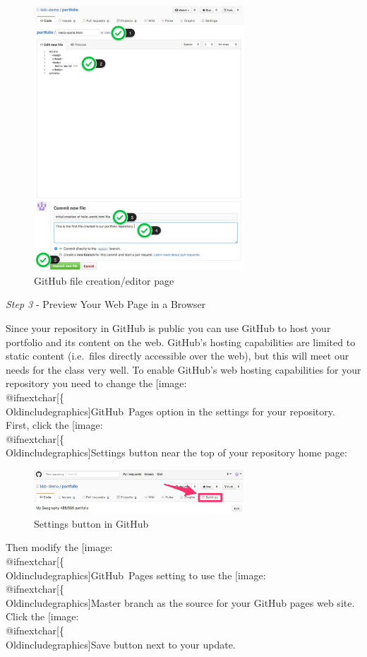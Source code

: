 \documentclass[]{book}
\makeatletter
\def\ScaleIfNeeded{%
  \ifdim\Gin@nat@width>.5\linewidth
    .5\linewidth
  \else
    \Gin@nat@width
  \fi
}
\let\Oldincludegraphics\texttt{[image: \%
 \\catcode`\\@=11\\relax\%
 \%\\gdef\\includegraphics\{\\@ifnextchar[\{\\Oldincludegraphics]}{\Oldincludegraphics[width=\ScaleIfNeeded]}}%
\gdef\texttt{[image: \\@ifnextchar[\{\\Oldincludegraphics]}{\Oldincludegraphics[max size={.75\textwidth}{.75\textheight}]}}%
\makeatother
\begin{document}
\begin{figure}[htbp]
\centering
\includegraphics[width=0.70000\textwidth]{images/github_editor.jpg}
\caption{GitHub file creation/editor page}
\end{figure}

\emph{Step 3} - Preview Your Web Page in a Browser

Since your repository in GitHub is public you can use GitHub to host
your portfolio and its content on the web. GitHub's hosting capabilities
are limited to static content (i.e.~files directly accessible over the
web), but this will meet our needs for the class very well. To enable
GitHub's web hosting capabilities for your repository you need to change
the \texttt{GitHub\ Pages} option in the settings for your repository.
First, click the \texttt{Settings} button near the top of your
repository home page:

\begin{figure}[htbp]
\centering
\includegraphics[width=0.70000\textwidth]{images/github_settingsButton.jpg}
\caption{Settings button in GitHub}
\end{figure}

Then modify the \texttt{GitHub\ Pages} setting to use the
\texttt{Master} branch as the source for your GitHub pages web site.
Click the \texttt{Save} button next to your update.
\end{document}
